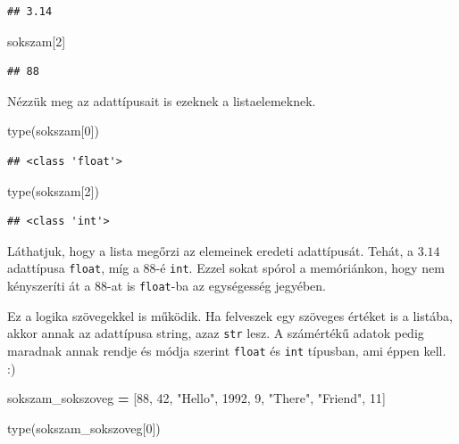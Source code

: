 \documentclass[
]{book}
\newenvironment{Shaded}{\begin{snugshade}}{\end{snugshade}}
\newcommand{\BuiltInTok}[1]{#1}
\newcommand{\DecValTok}[1]{\textcolor[rgb]{0.00,0.00,0.81}{#1}}
\newcommand{\NormalTok}[1]{#1}
\newcommand{\OperatorTok}[1]{\textcolor[rgb]{0.81,0.36,0.00}{\textbf{#1}}}
\newcommand{\StringTok}[1]{\textcolor[rgb]{0.31,0.60,0.02}{#1}}
\begin{document}
\begin{verbatim}
## 3.14
\end{verbatim}

\begin{Shaded}
\begin{Highlighting}[]
\NormalTok{sokszam[}\DecValTok{2}\NormalTok{]}
\end{Highlighting}
\end{Shaded}

\begin{verbatim}
## 88
\end{verbatim}

Nézzük meg az adattípusait is ezeknek a listaelemeknek.

\begin{Shaded}
\begin{Highlighting}[]
\BuiltInTok{type}\NormalTok{(sokszam[}\DecValTok{0}\NormalTok{])}
\end{Highlighting}
\end{Shaded}

\begin{verbatim}
## <class 'float'>
\end{verbatim}

\begin{Shaded}
\begin{Highlighting}[]
\BuiltInTok{type}\NormalTok{(sokszam[}\DecValTok{2}\NormalTok{])}
\end{Highlighting}
\end{Shaded}

\begin{verbatim}
## <class 'int'>
\end{verbatim}

Láthatjuk, hogy a lista megőrzi az elemeinek eredeti adattípusát. Tehát, a \(3.14\) adattípusa \texttt{float}, míg a \(88\)-é \texttt{int}. Ezzel sokat spórol a memóriánkon, hogy nem kényszeríti át a \(88\)-at is \texttt{float}-ba az egységesség jegyében.

Ez a logika szövegekkel is működik. Ha felveszek egy szöveges értéket is a listába, akkor annak az adattípusa string, azaz \texttt{str} lesz. A számértékű adatok pedig maradnak annak rendje és módja szerint \texttt{float} és \texttt{int} típusban, ami éppen kell. :)

\begin{Shaded}
\begin{Highlighting}[]
\NormalTok{sokszam\_sokszoveg }\OperatorTok{=}\NormalTok{ [}\DecValTok{88}\NormalTok{, }\DecValTok{42}\NormalTok{, }\StringTok{"Hello"}\NormalTok{, }\DecValTok{1992}\NormalTok{, }\DecValTok{9}\NormalTok{, }\StringTok{"There"}\NormalTok{, }\StringTok{"Friend"}\NormalTok{, }\DecValTok{11}\NormalTok{]}

\BuiltInTok{type}\NormalTok{(sokszam\_sokszoveg[}\DecValTok{0}\NormalTok{])}
\end{Highlighting}
\end{Shaded}
\end{document}
